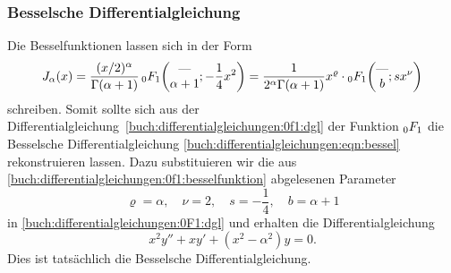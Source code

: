 %
%
\subsubsection{Besselsche Differentialgleichung}
Die Besselfunktionen lassen sich in der Form
\begin{equation}
J_\alpha(x)
=
\frac{(x/2)^\alpha}{\Gamma(\alpha+1)} \,
\mathstrut_0F_1\biggl(
\begin{matrix}\text{---}\\\alpha+1\end{matrix};-\frac14x^2
\biggr)
=
\frac{1}{2^\alpha\Gamma(\alpha+1)}
x^\varrho\cdot
\mathstrut_0F_1\biggl(
\begin{matrix}\text{---}\\b\end{matrix};sx^\nu
\biggr)
\label{buch:differentialgleichungen:0f1:besselfunktion}
\end{equation}
schreiben.
Somit sollte sich aus der
Differentialgleichung~\eqref{buch:differentialgleichungen:0f1:dgl}
der Funktion $\mathstrut_0F_1$ die Besselsche Differentialgleichung
\eqref{buch:differentialgleichungen:eqn:bessel} rekonstruieren lassen.
Dazu substituieren wir die aus
\eqref{buch:differentialgleichungen:0f1:besselfunktion}
abgelesenen Parameter
\[
\varrho=\alpha,\quad\nu=2,\quad s=-\frac14,\quad b=\alpha+1
\]
in \eqref{buch:differentialgleichungen:0F1:dgl} und erhalten
die Differentialgleichung
\begin{equation}
x^2y''
+
xy'
+
(x^2 - \alpha^2)y
=
0.
\label{buch:differentialgleichungen:0F1:besseldgl}
\end{equation}
Dies ist tatsächlich die Besselsche Differentialgleichung.

%
%

